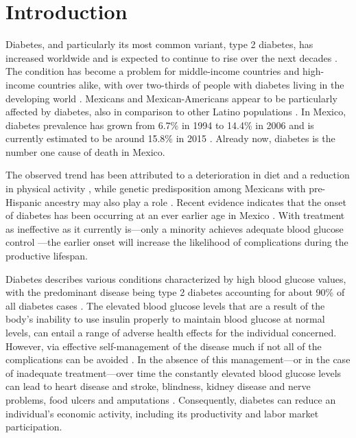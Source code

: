 \documentclass[12pt,english]{article}
\begin{document}
\section{\label{sec:Introduction4}Introduction }

Diabetes, and particularly its most common variant, type 2 diabetes, has increased worldwide and is expected to continue to rise over the next decades \parencite{Risk2016}. The condition has become a problem for middle-income countries and high-income countries alike, with over two-thirds of people with diabetes living in the developing world \parencite{InternationalDiabetesFederation2015}. Mexicans and Mexican-Americans appear to be particularly affected by diabetes, also in comparison to other Latino populations \parencite{Schneiderman2014}. In Mexico, diabetes prevalence has grown from 6.7\% in 1994 to 14.4\% in 2006 \autocite{Barquera2013} and is currently estimated to be around 15.8\% in 2015 \parencite{InternationalDiabetesFederation2015}. Already now, diabetes is the number one cause of death in Mexico. 

The observed trend has been attributed to a deterioration in diet and a reduction in physical activity \parencite{Barquera2008b,Basu2013}, while genetic predisposition among Mexicans with pre-Hispanic ancestry may also play a role \parencite{Williams2013}. Recent evidence indicates that the onset of diabetes has been occurring at an ever earlier age in Mexico \parencite{Bello-Chavolla2017a}. With treatment as ineffective as it currently is---only a minority achieves adequate blood glucose control \parencite{Barquera2013}---the earlier onset will increase the likelihood of complications during the productive lifespan. 

Diabetes describes various conditions characterized by high blood glucose values, with the predominant disease being type 2 diabetes accounting for about 90\% of all diabetes cases \parencite{Sicree2009}. The elevated
blood glucose levels that are a result of the body's inability to use insulin properly to maintain blood glucose at normal levels, can entail a range of adverse health effects for the individual concerned. However, via effective self-management of the disease much if not all of the complications can be avoided \parencite{Lim2011, Gregg2012}. In the absence of this management---or in the case of inadequate treatment---over time the constantly elevated blood glucose levels can lead to heart disease and stroke, blindness, kidney disease and nerve problems, food ulcers and amputations \parencite{Reynoso-Noveron2011}. Consequently, diabetes can reduce an individual's economic activity, including its productivity and labor market participation.
\end{document}
